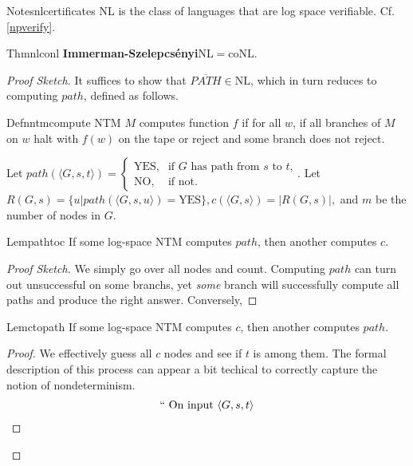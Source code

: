 \begin{reference}{Notes}{nlcertificates}
  NL is the class of languages that are log space verifiable. Cf. \ref{npverify}.
\end{reference}

\begin{reference}{Thm}{nlconl}
  \textbf{Immerman-Szelepcs\'enyi}\quad $\mathrm{NL}=\mathrm{coNL}$.
\end{reference}

\begin{proof}[Proof Sketch]
  It suffices to show that $\overline{\textit{PATH}}\in \mathrm{NL}$, which in turn reduces to computing $path$, defined as follows.
  \begin{reference}{Defn}{ntmcompute}
    NTM $M$ computes function $f$ if for all $w$, if all branches of $M$ on $w$ halt with $f(w)$ on the tape or reject and some branch does not reject.
  \end{reference}
  Let $path(\langle G,s,t\rangle)=\begin{cases}\text{YES,}&\text{if $G$ has path from $s$ to $t$,}\\ \text{NO,}&\text{if not.}\end{cases}$.\newline
  Let $R(G,s)=\{u|path(\langle G,s,u\rangle)=\text{YES}\},c(\langle G,s\rangle)=|R(G,s)|,$ and $m$ be the number of nodes in $G$.
  \begin{reference}{Lem}{pathtoc}
    If some log-space NTM computes $path$, then another computes $c$.
  \end{reference}
  \begin{proof}[Proof Sketch]
    We simply go over all nodes and count. Computing $path$ can turn out unsuccessful on some branchs, yet \textit{some} branch will successfully compute all paths and produce the right answer. Conversely,
  \end{proof}
  \begin{reference}{Lem}{ctopath}
    If some log-space NTM computes $c$, then another computes $path$.
  \end{reference}
  \begin{proof}
    We effectively guess all $c$ nodes and see if $t$ is among them. The formal description of this process can appear a bit techical to correctly capture the notion of nondeterminism.
    \begin{align*}
      {``} & \text{ On input }\langle G,s,t\rangle                                                      \\

\end{align*}
\end{proof}
\end{proof}
